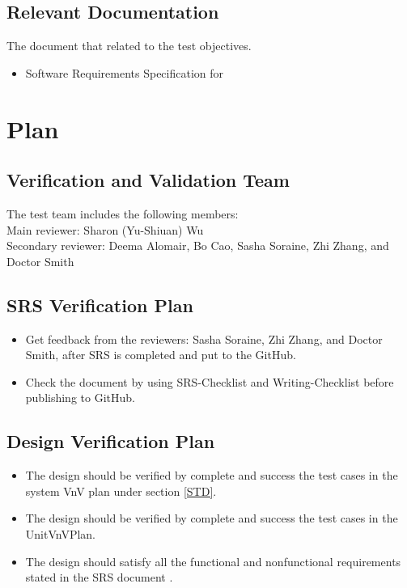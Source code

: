 \documentclass[12pt, titlepage]{article}
\begin{document}
\subsection{Relevant Documentation}\label{RD}

The document that related to the test objectives.

\begin{itemize} 
\item Software Requirements Specification for \progname [Wu~\cite{YS2019}] 
 \end{itemize} 

 \section{Plan}	
\subsection{Verification and Validation Team} The test team includes the
following members:\\ 
Main reviewer: Sharon (Yu-Shiuan) Wu\\ 
Secondary reviewer: Deema Alomair, Bo Cao, Sasha Soraine, Zhi Zhang, 
and Doctor Smith\\
\subsection{SRS Verification Plan}

\begin{itemize}

\item Get feedback from the reviewers: Sasha Soraine, Zhi Zhang, and Doctor
Smith, after SRS is completed and put to the GitHub.
\item Check the document by using SRS-Checklist and Writing-Checklist before
publishing to GitHub.

\end{itemize}


\subsection{Design Verification Plan}\label{Planfordv}
\begin{itemize}

\item The design should be verified by complete and success the test cases in
the system VnV plan under section \ref{STD}.
\item The design should be verified by complete and success the test cases in the UnitVnVPlan. 
\item The design should satisfy all the functional and nonfunctional requirements stated in the SRS document \cite{YS2019}.

\end{itemize}
\end{document}
